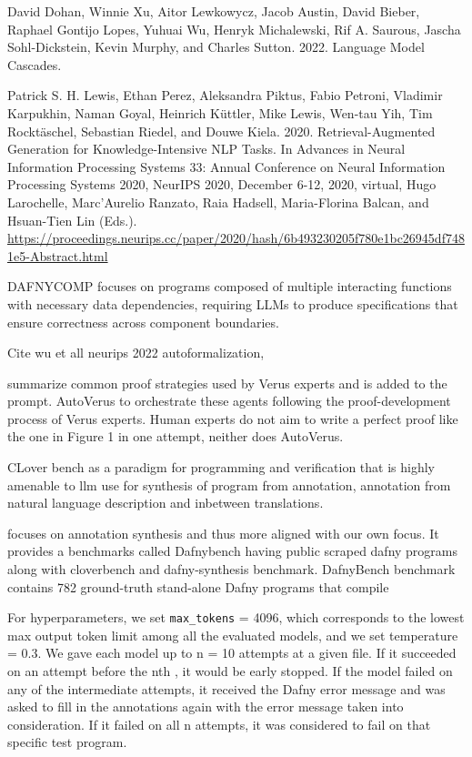 \documentclass[12pt,letterpaper]{article}
\begin{document}
David Dohan, Winnie Xu, Aitor Lewkowycz, Jacob Austin, David Bieber, Raphael Gontijo Lopes, Yuhuai Wu, Henryk
Michalewski, Rif A. Saurous, Jascha Sohl-Dickstein, Kevin Murphy, and Charles Sutton. 2022. Language Model Cascades.

Patrick S. H. Lewis, Ethan Perez, Aleksandra Piktus, Fabio Petroni, Vladimir
Karpukhin, Naman Goyal, Heinrich K\"uttler, Mike Lewis, Wen-tau Yih, Tim
Rockt\"aschel, Sebastian Riedel, and Douwe Kiela. 2020. Retrieval-Augmented
Generation for Knowledge-Intensive NLP Tasks. In Advances in Neural Information
Processing Systems 33: Annual Conference on Neural Information Processing
Systems 2020, NeurIPS 2020, December 6-12, 2020, virtual, Hugo Larochelle,
Marc'Aurelio Ranzato, Raia Hadsell, Maria-Florina Balcan, and Hsuan-Tien Lin
(Eds.). \url{https://proceedings.neurips.cc/paper/2020/hash/6b493230205f780e1bc26945df7481e5-Abstract.html}

\cite{xu2025localsuccessdoescompose} DAFNYCOMP
focuses on programs composed of multiple interacting functions with necessary data dependencies,
requiring LLMs to produce specifications that ensure correctness across component boundaries.

Cite wu et all neurips 2022 autoformalization, 

\cite{chenyuan_2025_oopsla}summarize common proof strategies used by Verus
experts and is added to the prompt. AutoVerus to orchestrate these agents
following the proof-development process of Verus experts. Human experts do not aim to write a perfect proof like the one in Figure
1 in one attempt, neither does AutoVerus.

\cite{sun_2024_saiv} CLover bench as a paradigm for programming and verification that is highly amenable to llm use for synthesis of program from annotation, annotation from natural language description and inbetween translations.

\cite{loughridge2025dafnybench} focuses on annotation synthesis and thus more aligned with our own focus. It provides a benchmarks called Dafnybench having public scraped dafny programs along with cloverbench and dafny-synthesis benchmark. DafnyBench benchmark contains 782 ground-truth stand-alone Dafny programs that
compile

For hyperparameters, we set \texttt{max\_tokens} = 4096, which corresponds to the lowest
max output token limit among all the evaluated models, and we set temperature =
0.3. We gave each model up to n = 10 attempts at a given file. If it succeeded
on an attempt before the nth , it would be early stopped. If the model failed on
any of the intermediate attempts, it received the Dafny error message and was
asked to fill in the annotations again with the error message taken into
consideration. If it failed on all n attempts, it was considered to fail on that
specific test program.
\end{document}
